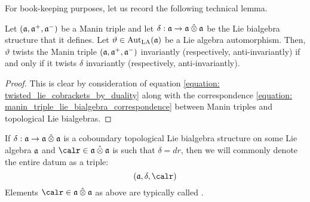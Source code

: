         For book-keeping purposes, let us record the following technical lemma.
        \begin{lemma} \label{lemma: twisted_manin_triples_and_twisted_topological_lie_bialgebras}
            Let $(\mathfrak{a}, \mathfrak{a}^+, \mathfrak{a}^-)$ be a Manin triple and let $\delta: \a \to \a \hattensor \a$ be the Lie bialgebra structure that it defines. Let $\vartheta \in \operatorname{Aut}_{\mathrm{LA}}(\mathfrak{a})$ be a Lie algebra automorphism. Then, $\vartheta$ twists the Manin triple $(\mathfrak{a}, \mathfrak{a}^+, \mathfrak{a}^-)$ invariantly (respectively, anti-invariantly) if and only if it twists $\delta$ invariantly (respectively, anti-invariantly).
        \end{lemma}
            \begin{proof}
                This is clear by consideration of equation \eqref{equation: twisted_lie_cobrackets_by_duality} along with the correspondence \eqref{equation: manin_triple_lie_bialgebra_correspondence} between Manin triples and topological Lie bialgebras.
            \end{proof}

        \begin{convention}
            If $\delta: \a \to \a \hattensor \a$ is a coboundary topological Lie bialgebra structure on some Lie algebra $\mathfrak{a}$ and $\calr \in \a \hattensor \a$ is such that $\delta = dr$, then we will commonly denote the entire datum as a triple:
                $$(\a, \delta, \calr)$$
            Elements $\calr \in \a \hattensor \a$ as above are typically called .
        \end{convention}

